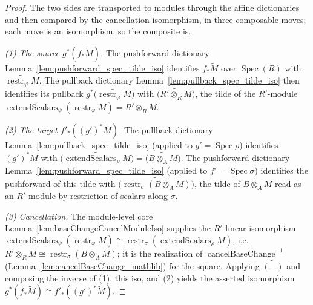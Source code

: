 \begin{proof}
        \leanok
  The two sides are transported to modules through the affine dictionaries and then
  compared by the cancellation isomorphism, in three composable moves; each move is an
  isomorphism, so the composite is.

  \emph{(1) The source \(g^*(f_*\widetilde{M})\).} The pushforward dictionary
  Lemma~\ref{lem:pushforward_spec_tilde_iso} identifies \(f_*\widetilde{M}\) over
  \(\operatorname{Spec}(R)\) with \(\widetilde{\operatorname{restr}_\varphi M}\). The
  pullback dictionary Lemma~\ref{lem:pullback_spec_tilde_iso} then identifies its
  pullback \(g^*\bigl(\widetilde{\operatorname{restr}_\varphi M}\bigr)\) with
  \(\widetilde{\bigl(R' \otimes_R M\bigr)}\), the tilde of the \(R'\)-module
  \(\operatorname{extendScalars}_\psi(\operatorname{restr}_\varphi M) = R' \otimes_R M\).

  \emph{(2) The target \(f'_*((g')^*\widetilde{M})\).} The pullback dictionary
  Lemma~\ref{lem:pullback_spec_tilde_iso} (applied to \(g' = \operatorname{Spec}\rho\))
  identifies \((g')^*\widetilde{M}\) with
  \(\widetilde{\bigl(\operatorname{extendScalars}_\rho M\bigr)}
  = \widetilde{\bigl(B \otimes_A M\bigr)}\). The pushforward dictionary
  Lemma~\ref{lem:pushforward_spec_tilde_iso} (applied to
  \(f' = \operatorname{Spec}\sigma\)) identifies the pushforward of this tilde with
  \(\widetilde{\bigl(\operatorname{restr}_\sigma(B \otimes_A M)\bigr)}\), the tilde of
  \(B \otimes_A M\) read as an \(R'\)-module by restriction of scalars along \(\sigma\).

  \emph{(3) Cancellation.} The module-level core
  Lemma~\ref{lem:baseChangeCancelModuleIso} supplies the \(R'\)-linear isomorphism
  \(\operatorname{extendScalars}_\psi(\operatorname{restr}_\varphi M) \cong
  \operatorname{restr}_\sigma(\operatorname{extendScalars}_\rho M)\), i.e.\
  \(R' \otimes_R M \cong \operatorname{restr}_\sigma(B \otimes_A M)\); it is the
  realization of \(\operatorname{cancelBaseChange}^{-1}\)
  (Lemma~\ref{lem:cancelBaseChange_mathlib}) for the square. Applying
  \(\widetilde{(-)}\) and composing the inverse of (1), this iso, and (2) yields the
  asserted isomorphism \(g^*(f_*\widetilde{M}) \cong f'_*((g')^*\widetilde{M})\).


\end{proof}
